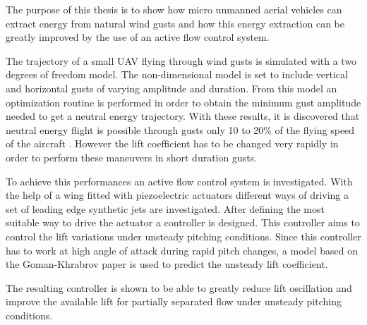 \par The purpose of this thesis is to show how micro unmanned aerial vehicles can extract energy from natural wind gusts and how this energy extraction can be greatly improved by the use of an active flow control system.

\par The trajectory of a small UAV flying through wind gusts is simulated with a two degrees of freedom model.
The non-dimensional model is set to include vertical and horizontal gusts of varying amplitude and duration.
From this model an optimization routine is performed in order to obtain the minimum gust amplitude needed to get a neutral energy trajectory.
With these results, it is discovered that neutral energy flight is possible through gusts only 10 to 20\% of the flying speed of the aircraft .
However the lift coefficient has to be changed very rapidly in order to perform these maneuvers in short duration gusts. 

\par To achieve this performances an active flow control system is investigated.
With the help of a wing fitted with piezoelectric actuators different ways of driving a set of leading edge synthetic jets are investigated.
After defining the most suitable way to drive the actuator a controller is designed. 
This controller aims to control the lift variations under unsteady pitching conditions.
Since this controller has to work at high angle of attack during rapid pitch changes, a model based on the Goman-Khrabrov paper \cite{GK} is used to predict the unsteady lift coefficient.

\par The resulting controller is shown to be able to greatly reduce lift oscillation and improve the available lift for partially separated flow under unsteady pitching conditions.
